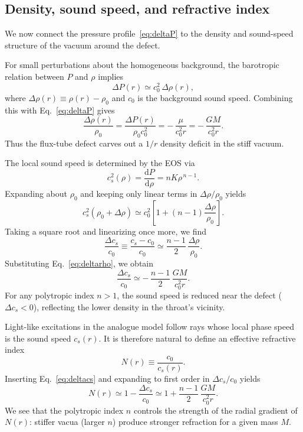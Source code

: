 \documentclass[11pt]{article}
\begin{document}
\subsection{Density, sound speed, and refractive index}
\label{subsec:rho-cs-N}

We now connect the pressure profile~\eqref{eq:deltaP} to the density and
sound-speed structure of the vacuum around the defect.

For small perturbations about the homogeneous background, the barotropic
relation between $P$ and $\rho$ implies
\begin{equation}
  \Delta P(r) \simeq c_0^2\,\Delta\rho(r),
\end{equation}
where $\Delta\rho(r) \equiv \rho(r) - \rho_0$ and $c_0$ is the background
sound speed.
Combining this with Eq.~\eqref{eq:deltaP} gives
\begin{equation}
  \frac{\Delta\rho(r)}{\rho_0}
  = \frac{\Delta P(r)}{\rho_0 c_0^2}
  = -\,\frac{\mu}{c_0^2 r}
  = -\,\frac{GM}{c_0^2 r}.
  \label{eq:deltarho}
\end{equation}
Thus the flux-tube defect carves out a $1/r$ density deficit in the stiff
vacuum.

The local sound speed is determined by the EOS via
\begin{equation}
  c_s^2(\rho)
  = \frac{\mathrm{d}P}{\mathrm{d}\rho}
  = n K \rho^{\,n-1}.
\end{equation}
Expanding about $\rho_0$ and keeping only linear terms in
$\Delta\rho/\rho_0$ yields
\begin{equation}
  c_s^2(\rho_0 + \Delta\rho)
  \simeq c_0^2\left[1 + (n-1)\frac{\Delta\rho}{\rho_0}\right].
\end{equation}
Taking a square root and linearizing once more, we find
\begin{equation}
  \frac{\Delta c_s}{c_0}
  \equiv \frac{c_s - c_0}{c_0}
  \simeq \frac{n-1}{2}\,\frac{\Delta\rho}{\rho_0}.
  \label{eq:deltacs-rho}
\end{equation}
Substituting Eq.~\eqref{eq:deltarho}, we obtain
\begin{equation}
  \frac{\Delta c_s}{c_0}
  \simeq -\,\frac{n-1}{2}\,\frac{GM}{c_0^2 r}.
  \label{eq:deltacs}
\end{equation}
For any polytropic index $n>1$, the sound speed is reduced near the defect
($\Delta c_s < 0$), reflecting the lower density in the throat's vicinity.

Light-like excitations in the analogue model follow rays whose local phase
speed is the sound speed $c_s(r)$.
It is therefore natural to define an effective refractive index
\begin{equation}
  N(r)
  \equiv \frac{c_0}{c_s(r)}.
\end{equation}
Inserting Eq.~\eqref{eq:deltacs} and expanding to first order in
$\Delta c_s/c_0$ yields
\begin{equation}
  N(r)
  \simeq 1 - \frac{\Delta c_s}{c_0}
  \simeq 1 + \frac{n-1}{2}\,\frac{GM}{c_0^2 r}.
  \label{eq:N-general-n}
\end{equation}
We see that the polytropic index $n$ controls the strength of the radial
gradient of $N(r)$: stiffer vacua (larger $n$) produce stronger refraction
for a given mass $M$.
\end{document}
